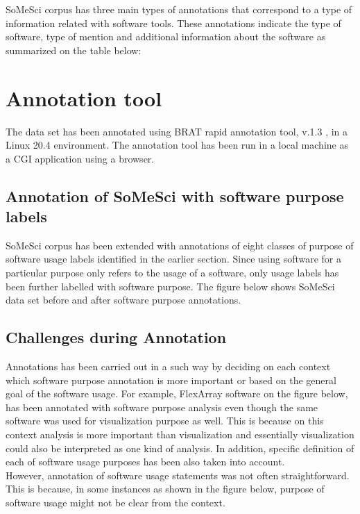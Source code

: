 SoMeSci corpus has three main types of annotations that correspond to a type of information related with software tools. These annotations indicate the type of software, type of mention and additional information about the software as summarized on the table below:


\section{Annotation tool}
\label{sec:dataset:tool}
The data set has been annotated using BRAT rapid annotation tool, v.1.3 , in a Linux 20.4 environment. The annotation tool has been run in a local machine as a CGI application using a browser. 

\subsection{Annotation of SoMeSci with software purpose labels}
\label{subsec:dataset:tool:Annotationprocess}

SoMeSci corpus has been extended with annotations of eight classes of purpose of software usage labels identified in the earlier section. Since using software for a particular purpose only refers to the usage of a software, only usage labels has been further labelled with software purpose. The figure below shows SoMeSci data set before and after software purpose annotations. \\

\subsection{Challenges during Annotation }
\label{subsec:dataset:tool:Challenges}
Annotations has been carried out in a such way by deciding on each context which software purpose annotation is more important or based on the general goal of the software usage. For example, FlexArray software on the figure below, has been annotated with software purpose analysis even though the same software was used for visualization purpose as well. This is because on this context analysis is more important than visualization and essentially visualization could also be interpreted as one kind of analysis. In addition, specific definition of each of software usage purposes has been also taken into account. \\

However, annotation of software usage statements was not often straightforward. This is because, in some instances as shown in the figure below, purpose of software usage might not be clear from the context.\\

